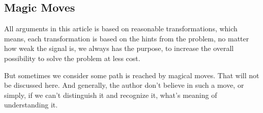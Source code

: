 \subsection{Magic Moves}

All arguments in this article is based on reasonable transformations, which means, each transformation is based on the hints from the problem, no matter how weak the signal is, we always has the purpose, to increase the overall possibility to solve the problem at less cost.

But sometimes we consider some path is reached by magical moves. That will not be discussed here. And generally, the author don't believe in such a move, or simply, if we can't distinguish it and recognize it, what's meaning of understanding it.
